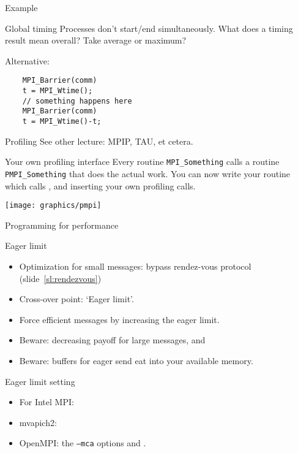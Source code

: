 \begin{numberedframe}{Example}
\end{numberedframe}

\begin{numberedframe}{Global timing}
  Processes don't start/end simultaneously. What does a timing result
  mean overall? Take average or maximum?

  Alternative:
\begin{lstlisting}
    MPI_Barrier(comm)
    t = MPI_Wtime();
    // something happens here
    MPI_Barrier(comm)
    t = MPI_Wtime()-t;
\end{lstlisting}
\end{numberedframe}

\begin{numberedframe}{Profiling}
  See other lecture: 
  MPIP, TAU, et cetera.
\end{numberedframe}

\begin{numberedframe}{Your own profiling interface}
  Every routine \lstinline{MPI_Something} calls a routine \lstinline{PMPI_Something} that 
  does the actual work. You can now write your  routine
  which calls , and inserting your own profiling calls.

  \texttt{[image: graphics/pmpi]}
\end{numberedframe}

 {Programming for performance}

\begin{numberedframe}{Eager limit}
  \begin{itemize}
  \item Optimization for small messages: bypass rendez-vous protocol
    (slide~\ref{sl:rendezvous})
  \item Cross-over point: `Eager limit'.
  \item Force efficient messages by increasing the eager limit.
  \item Beware: decreasing payoff for large messages, and
  \item Beware: buffers for eager send eat into your available memory.
  \end{itemize}
\end{numberedframe}

\begin{numberedframe}{Eager limit setting}
    \begin{itemize}
    \item For Intel MPI: 
    \item mvapich2: 
    \item OpenMPI:  the
      \texttt{--mca} options  and
      .
    \end{itemize}
\end{numberedframe}

